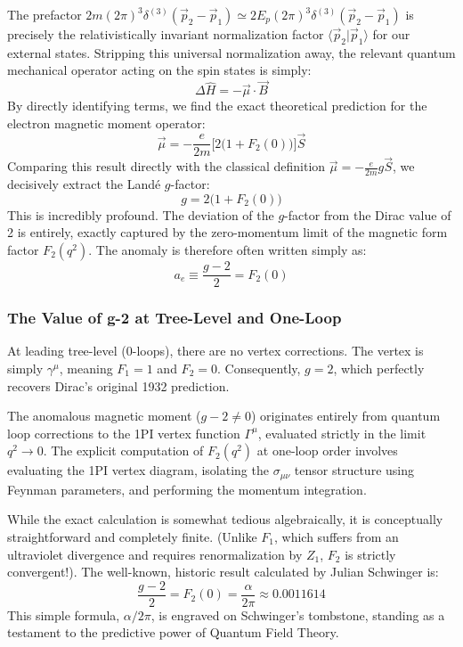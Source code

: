 The prefactor $2m (2\pi)^3 \delta^{(3)}(\vec{p}_2 - \vec{p}_1) \simeq 2E_p (2\pi)^3 \delta^{(3)}(\vec{p}_2 - \vec{p}_1)$ is precisely the relativistically invariant normalization factor $\langle \vec{p}_2 | \vec{p}_1 \rangle$ for our external states. Stripping this universal normalization away, the relevant quantum mechanical operator acting on the spin states is simply:
\[
    \Delta \hat{H} = -\vec{\mu} \cdot \vec{B}
\]
By directly identifying terms, we find the exact theoretical prediction for the electron magnetic moment operator:
\[
    \vec{\mu} = -\frac{e}{2m} \Big[ 2 \big( 1 + F_2(0) \big) \Big] \vec{S}
\]
Comparing this result directly with the classical definition $\vec{\mu} = -\frac{e}{2m} g \vec{S}$, we decisively extract the Landé $g$-factor:
\[
    g = 2 \big( 1 + F_2(0) \big)
\]
This is incredibly profound. The deviation of the $g$-factor from the Dirac value of 2 is entirely, exactly captured by the zero-momentum limit of the magnetic form factor $F_2(q^2)$. The anomaly is therefore often written simply as:
\[
    a_e \equiv \frac{g - 2}{2} = F_2(0)
\]

\subsubsection{The Value of g-2 at Tree-Level and One-Loop}

At leading tree-level (0-loops), there are no vertex corrections. The vertex is simply $\gamma^\mu$, meaning $F_1 = 1$ and $F_2 = 0$. Consequently, $g = 2$, which perfectly recovers Dirac's original 1932 prediction.

The anomalous magnetic moment ($g - 2 \neq 0$) originates entirely from quantum loop corrections to the 1PI vertex function $\Gamma^\mu$, evaluated strictly in the limit $q^2 \to 0$. The explicit computation of $F_2(q^2)$ at one-loop order involves evaluating the 1PI vertex diagram, isolating the $\sigma_{\mu\nu}$ tensor structure using Feynman parameters, and performing the momentum integration.

While the exact calculation is somewhat tedious algebraically, it is conceptually straightforward and completely finite. (Unlike $F_1$, which suffers from an ultraviolet divergence and requires renormalization by $Z_1$, $F_2$ is strictly convergent!). The well-known, historic result calculated by Julian Schwinger is:
\[
    \frac{g - 2}{2} = F_2(0) = \frac{\alpha}{2\pi} \approx 0.0011614
\]
This simple formula, $\alpha/2\pi$, is engraved on Schwinger's tombstone, standing as a testament to the predictive power of Quantum Field Theory.